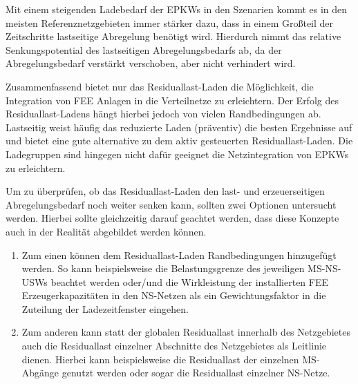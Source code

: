 Mit einem steigenden Ladebedarf der \glspl{EPKW} in den Szenarien kommt es in den meisten Referenznetzgebieten immer stärker dazu, dass in einem Großteil der Zeitschritte lastseitige Abregelung benötigt wird.
Hierdurch nimmt das relative Senkungspotential des lastseitigen Abregelungsbedarfs ab, da der Abregelungsbedarf verstärkt verschoben, aber nicht verhindert wird.\medskip

Zusammenfassend bietet nur das Residuallast-Laden die Möglichkeit, die Integration von \gls{FEE} Anlagen in die Verteilnetze zu erleichtern.
Der Erfolg des Residuallast-Ladens hängt hierbei jedoch von vielen Randbedingungen ab.
Lastseitig weist häufig das reduzierte Laden (präventiv) die besten Ergebnisse auf und bietet eine gute alternative zu dem aktiv gesteuerten Residuallast-Laden.
Die Ladegruppen sind hingegen nicht dafür geeignet die Netzintegration von \glspl{EPKW} zu erleichtern.\medskip

Um zu überprüfen, ob das Residuallast-Laden den last- und erzeuerseitigen Abregelungsbedarf noch weiter senken kann, sollten zwei Optionen untersucht werden.
Hierbei sollte gleichzeitig darauf geachtet werden, dass diese Konzepte auch in der Realität abgebildet werden können.

\begin{enumerate}
	\item Zum einen können dem Residuallast-Laden Randbedingungen hinzugefügt werden.
	So kann beispielsweise die Belastungsgrenze des jeweiligen \gls{MS}-\gls{NS}-\glspl{USW} beachtet werden oder/und die Wirkleistung der installierten \gls{FEE} Erzeugerkapazitäten in den \gls{NS}-Netzen als ein Gewichtungsfaktor in die Zuteilung der Ladezeitfenster eingehen.
	\item Zum anderen kann statt der globalen Residuallast innerhalb des Netzgebietes auch die Residuallast einzelner Abschnitte des Netzgebietes als Leitlinie dienen.
	Hierbei kann beispielsweise die Residuallast der einzelnen \gls{MS}-Abgänge genutzt werden oder sogar die Residuallast einzelner \gls{NS}-Netze.
\end{enumerate}


